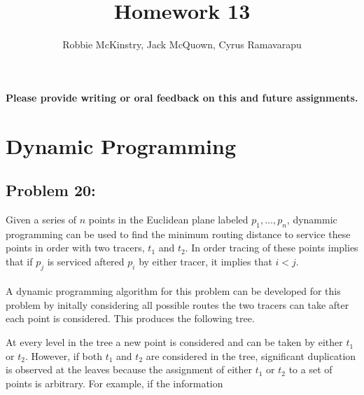 \documentclass[12pt]{article}
\begin{document}
\title{Homework 13}
\author{Robbie McKinstry, Jack McQuown, Cyrus Ramavarapu}
\renewcommand{\today}{30 September 2016}
\renewcommand{\baselinestretch}{1.5}
\maketitle

\textbf{Please provide writing or oral feedback on this and future assignments.}

\section*{Dynamic Programming}
\subsection*{Problem 20: }
Given a series of $n$ points in the Euclidean plane labeled
$p_1,\dots,p_n$, dynammic programming can be used to find the 
minimum routing distance to service these points in order
with two tracers, $t_1$ and $t_2$.  In order tracing of these points
implies that if $p_j$ is serviced aftered $p_i$ by either tracer, it 
implies that $i<j$.\\\\
A dynamic programming algorithm for this problem can be
developed for this problem by initally considering all possible
routes the two tracers can take after each point is considered. 
This produces the following tree.
\begin{center}
\end{center} 
At every level in the tree a new point is considered and can be
taken by either $t_1$ or $t_2$.  However, if both $t_1$ and $t_2$
are considered in the tree, significant duplication is observed
at the leaves because the assignment of either $t_1$ or $t_2$ to
a set of points is arbitrary.  For example, if the information
\end{document}
